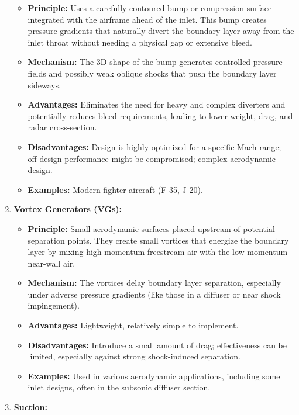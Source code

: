 \begin{enumerate}
  \begin{itemize}
  \tightlist
  \item
    \textbf{Principle:} Uses a carefully contoured bump or compression
    surface integrated with the airframe ahead of the inlet. This bump
    creates pressure gradients that naturally divert the boundary layer
    away from the inlet throat without needing a physical gap or
    extensive bleed.
  \item
    \textbf{Mechanism:} The 3D shape of the bump generates controlled
    pressure fields and possibly weak oblique shocks that push the
    boundary layer sideways.
  \item
    \textbf{Advantages:} Eliminates the need for heavy and complex
    diverters and potentially reduces bleed requirements, leading to
    lower weight, drag, and radar cross-section.
  \item
    \textbf{Disadvantages:} Design is highly optimized for a specific
    Mach range; off-design performance might be compromised; complex
    aerodynamic design.
  \item
    \textbf{Examples:} Modern fighter aircraft (F-35, J-20).
  \end{itemize}
\item
  \textbf{Vortex Generators (VGs):}

  \begin{itemize}
  \tightlist
  \item
    \textbf{Principle:} Small aerodynamic surfaces placed upstream of
    potential separation points. They create small vortices that
    energize the boundary layer by mixing high-momentum freestream air
    with the low-momentum near-wall air.
  \item
    \textbf{Mechanism:} The vortices delay boundary layer separation,
    especially under adverse pressure gradients (like those in a
    diffuser or near shock impingement).
  \item
    \textbf{Advantages:} Lightweight, relatively simple to implement.
  \item
    \textbf{Disadvantages:} Introduce a small amount of drag;
    effectiveness can be limited, especially against strong
    shock-induced separation.
  \item
    \textbf{Examples:} Used in various aerodynamic applications,
    including some inlet designs, often in the subsonic diffuser
    section.
  \end{itemize}
\item
  \textbf{Suction:}


\end{enumerate}
